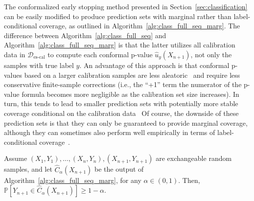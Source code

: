 The conformalized early stopping method presented in Section~\ref{sec:classification} can be easily modified to produce prediction sets with marginal rather than label-conditional coverage, as outlined in Algorithm~\ref{alg:class_full_seq_marg}.
The difference between Algorithm~\ref{alg:class_full_seq}  and Algorithm~\ref{alg:class_full_seq_marg} is that the latter utilizes all calibration data in $\mathcal{D}_{\text{es-cal}}$ to compute each conformal p-value $\hat{u}_y(X_{n+1})$, not only the samples with true label $y$.
An advantage of this approach is that conformal p-values based on a larger calibration samples are less aleatoric~\cite{bates2021testing} and require less conservative finite-sample corrections (i.e., the ``+1'' term the numerator of the p-value formula becomes more negligible as the calibration set size increases).
In turn, this tends to lead to smaller prediction sets with potentially more stable coverage conditional on the calibration data~\cite{sesia2020comparison,bates2021testing}
Of course, the downside of these prediction sets is that they can only be guaranteed to provide marginal coverage, although they can sometimes also perform well empirically in terms of label-conditional coverage~\cite{romano2020classification}.

\begin{theorem} \label{thm:class_full_marg}
Assume $(X_{1},Y_{1}), \ldots, (X_{n},Y_{n}), (X_{n+1},Y_{n+1})$ are exchangeable random samples, and let $\hat{C}_{\alpha}(X_{n+1})$ be the output of Algorithm~\ref{alg:class_full_seq_marg}, for any $\alpha \in (0,1)$. 
Then, $\mathbb{P}[Y_{n+1} \in \hat{C}_{\alpha}(X_{n+1})] \geq 1-\alpha$.
\end{theorem}

